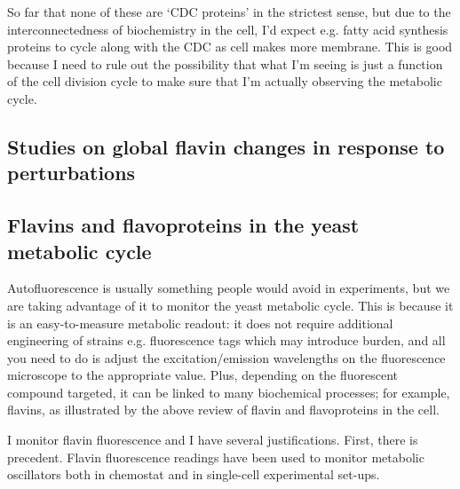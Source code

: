 So far that none of these are `CDC proteins' in the strictest sense, but due to the interconnectedness of biochemistry in the cell, I'd expect e.g. fatty acid synthesis proteins to cycle along with the CDC as cell makes more membrane.
This is good because I need to rule out the possibility that what I'm seeing is just a function of the cell division cycle to make sure that I'm actually observing the metabolic cycle.

\subsection{Studies on global flavin changes in response to perturbations}
\label{subsec:intro-flavin-perturbations}


\subsection{Flavins and flavoproteins in the yeast metabolic cycle}
\label{subsec:intro-flavin-ymc}

Autofluorescence is usually something people would avoid in experiments, but we are taking advantage of it to monitor the yeast metabolic cycle.
This is because it is an easy-to-measure metabolic readout: it does not require additional engineering of strains e.g. fluorescence tags which may introduce burden, and all you need to do is adjust the excitation/emission wavelengths on the fluorescence microscope to the appropriate value.
Plus, depending on the fluorescent compound targeted, it can be linked to many biochemical processes; for example, flavins, as illustrated by the above review of flavin and flavoproteins in the cell.

I monitor flavin fluorescence and I have several justifications.
First, there is precedent.
Flavin fluorescence readings have been used to monitor metabolic oscillators both in chemostat \citep{murrayRedoxRegulationRespiring2011} and in single-cell \citep{baumgartnerFlavinbasedMetabolicCycles2018} experimental set-ups.

